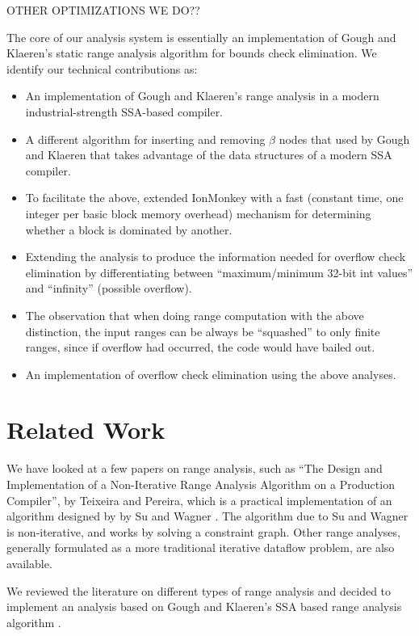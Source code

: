 \documentclass{article}
\begin{document}
OTHER OPTIMIZATIONS WE DO??

The core of our analysis system is essentially an implementation of
Gough and Klaeren's static range analysis algorithm for bounds check
elimination.
We identify our technical contributions as:
\begin{itemize}
\item An implementation of Gough and Klaeren's range analysis in a
  modern industrial-strength SSA-based compiler.
\item A different algorithm for inserting and removing $\beta$ nodes
  that used by Gough and Klaeren that takes advantage of the data
  structures of a modern SSA compiler.
\item To facilitate the above, extended IonMonkey with a fast
  (constant time, one integer per basic block memory overhead) 
  mechanism for determining whether a block is dominated by another.
\item Extending the analysis to produce the information needed for
  overflow check elimination by differentiating between
  ``maximum/minimum 32-bit int values'' and ``infinity'' (possible
  overflow).
\item The observation that when doing range computation with the above
  distinction, the input ranges can be always be ``squashed'' to only
  finite ranges, since if overflow had occurred, the code would have
  bailed out.
\item An implementation of overflow check elimination using the above
  analyses.
\end{itemize}


\section{Related Work}
We have looked at a few papers on range analysis, such as ``The Design
and Implementation of a Non-Iterative Range Analysis Algorithm on a
Production Compiler'', by Teixeira and Pereira, which is a practical
implementation of an algorithm designed by by Su and Wagner
\cite{Su04aclass}. The algorithm due to Su and Wagner is
non-iterative, and works by solving a constraint graph. Other range
analyses, generally formulated as a more traditional iterative
dataflow problem, are also available.

We reviewed the literature on different types of range analysis and
decided to implement an analysis based on Gough and Klaeren's SSA
based range analysis algorithm \cite{Gough94eliminatingrange}.
\end{document}
